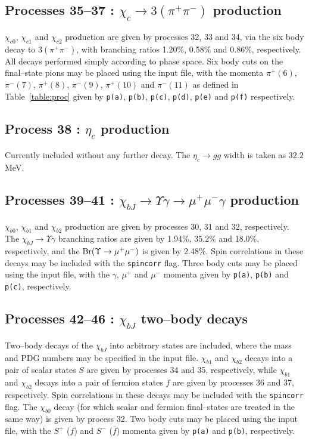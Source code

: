 \documentclass[12pt]{article}
\begin{document}
\subsection{Processes 35--37 : $\chi_c \to 3(\pi^+\pi^-)$ production}

$\chi_{c0}$, $\chi_{c1}$ and $\chi_{c2}$ production are given by processes 32, 33 and 34,  via the six body decay to $3(\pi^+\pi^-)$, with branching 
ratios 1.20\%, 0.58\% and 0.86\%, respectively. All decays performed simply according to phase space. Six body cuts on the final--state pions may be
 placed using the input file, with the momenta $\pi^+(6)$,  $\pi^-(7)$, $\pi^+(8)$, $\pi^-(9)$, $\pi^+(10)$ and $\pi^-(11)$ as defined in 
 Table~\ref{table:proc} given by \texttt{p(a)}, \texttt{p(b)}, \texttt{p(c)}, \texttt{p(d)}, \texttt{p(e)} and \texttt{p(f)} respectively.

\subsection{Process 38 : $\eta_c$ production}

Currently included without any further decay. The $\eta_c \to gg$ width is taken as $32.2$ MeV.

\subsection{Processes 39--41 : $\chi_{bJ}\to \Upsilon\gamma\to \mu^+\mu^-\gamma$ production}

$\chi_{b0}$, $\chi_{b1}$ and $\chi_{b2}$ production are given by processes 30, 31 and 32, respectively. The $\chi_{bJ}\to \Upsilon \gamma$ branching 
ratios are given by 1.94\%, 35.2\% and 18.0\%, respectively, and the ${\rm Br}(\Upsilon\to\mu^+\mu^-)$ is given by 2.48\%. Spin correlations in these 
decays may be included with the \texttt{spincorr} flag. Three body cuts may be placed using the input file, with the $\gamma$, $\mu^+$ and $\mu^-$ 
momenta given by \texttt{p(a)}, \texttt{p(b)} and \texttt{p(c)}, respectively.

\subsection{Processes 42--46 : $\chi_{bJ}$ two--body decays}

Two--body decays of the $\chi_{bJ}$ into arbitrary states are included, where the mass and PDG numbers may be specified in the input file. $\chi_{b1}$ 
and $\chi_{b2}$ decays into a pair of scalar states $S$ are given by processes 34 and 35, respectively, while $\chi_{b1}$ and $\chi_{b2}$ decays into 
a pair of fermion states $f$ are given by processes 36 and 37, respectively. Spin correlations in these decays may be included with the \texttt{spincorr}
 flag.  The $\chi_{b0}$ decay (for which scalar and fermion final--states are treated in the same way) is given by process 32. Two body cuts may be placed
  using the input file, with the $S^+$ ($f$) and $S^-$ ($\overline{f}$) momenta given by \texttt{p(a)} and \texttt{p(b)}, respectively.
\end{document}
